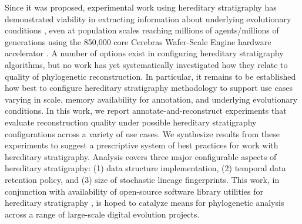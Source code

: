 Since it was proposed, experimental work using hereditary stratigraphy has demonstrated viability in extracting information about underlying evolutionary conditions \citep{moreno2024ecology}, even at population scales reaching millions of agents/millions of generations using the 850,000 core Cerebras Wafer-Scale Engine hardware accelerator \citep{moreno2024trackable}.
A number of options exist in configuring hereditary stratigraphy algorithms, but no work has yet systematically investigated how they relate to quality of phylogenetic reconstruction.
In particular, it remains to be established how best to configure hereditary stratigraphy methodology to support use cases varying in scale, memory availability for annotation, and underlying evolutionary conditions.
In this work, we report annotate-and-reconstruct experiments that evaluate reconstruction quality under possible hereditary stratigraphy configurations across a variety of use cases.
We synthesize results from these experiments to suggest a prescriptive system of best practices for work with hereditary stratigraphy.
Analysis covers three major configurable aspects of hereditary stratigraphy: (1) data structure implementation, (2) temporal data retention policy, and (3) size of stochastic lineage fingerprints.
This work, in conjunction with availability of open-source software library utilities for hereditary stratigraphy \citep{moreno2022hstrat}, is hoped to catalyze means for phylogenetic analysis across a range of large-scale digital evolution projects.
